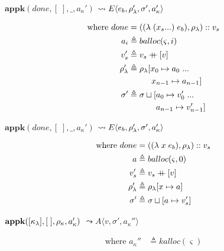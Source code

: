 \documentclass[12pt,draft]{article}
\newcommand\mdoubleplus{\ensuremath{\mathbin{+\mkern-9mu+}}}
\newcommand{\lamsyn}[2]{(\lambda\;(#1 ...)\;#2)}
\newcommand{\vararglamsyn}[2]{(\lambda\;#1\;#2)}
\newcommand{\store}[0]{\sigma}
\newcommand{\kaddr}[0]{a_{\kappa}}
\newcommand{\kont}[0]{\kappa}
\newcommand{\state}[0]{\varsigma}
\newcommand{\E}[4]{E\langle #1 , #2 , #3 , #4 \rangle}
\newcommand{\A}[3]{A\langle #1 , #2 , #3 \rangle}
\begin{document}
\begin{multicols*}{2}
\vfill\null
\columnbreak


\begin{center}
  $\textbf{appk}(done, [\;] , \_ , \kaddr')$
  $\leadsto \E{e_b}{\lamenv'}{\store'}{\kaddr'}$
\end{center}
\vspace{-7mm}
\begin{align*}
  \text{where }
  done &= (\lamsyn{x_s}{e_b} , \lamenv) :: v_s \\
  a_i &\triangleq balloc(\state, i) \\
  v'_s &\triangleq v_s \mdoubleplus [v] \\
  \lamenv' &\triangleq \lamenv[x_0 \mapsto a_0\;...\\
       &\;\;\;\;\;\;\;\;\;\;x_{n-1} \mapsto a_{n-1}] \\
  \store' &\triangleq \store \sqcup [a_0 \mapsto v'_0\;...\\
  &\;\;\;\;\;\;\;\;\;\;\;\; a_{n-1} \mapsto v'_{n-1}]
\end{align*}
\begin{center}
  $\textbf{appk}(done, [\;], \_, \kaddr')$
  $\leadsto \E{e_b}{\lamenv'}{\store'}{\kaddr'}$
\end{center}
\vspace{-7mm}
\begin{align*}
  \text{where }
  done &= (\vararglamsyn{x}{e_b} , \lamenv) :: v_s \\
  a &\triangleq balloc(\state, 0) \\
  v'_s &\triangleq v_s \mdoubleplus [v] \\
  \lamenv' &\triangleq \lamenv[x \mapsto a] \\
  \store' &\triangleq \store \sqcup [a \mapsto v'_s]
\end{align*}
\begin{center}
  $\textbf{appk}([\kont_\lambda] , [\;] , \kenv , \kaddr')$
  $\leadsto \A{v}{\store'}{\kaddr''}$
\end{center}
\vspace{-6mm}
\begin{align*}
  \text{where }
  \kaddr'' &\triangleq kalloc(\state) \\

\end{align*}
\end{multicols*}
\end{document}
